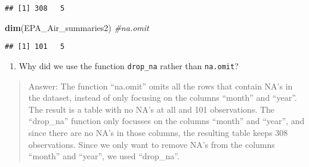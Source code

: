 \documentclass[
]{article}
\newenvironment{Shaded}{\begin{snugshade}}{\end{snugshade}}
\newcommand{\CommentTok}[1]{\textcolor[rgb]{0.56,0.35,0.01}{\textit{#1}}}
\newcommand{\KeywordTok}[1]{\textcolor[rgb]{0.13,0.29,0.53}{\textbf{#1}}}
\newcommand{\NormalTok}[1]{#1}
\providecommand{\tightlist}{%
  \setlength{\itemsep}{0pt}\setlength{\parskip}{0pt}}
\begin{document}
\begin{verbatim}
## [1] 308   5
\end{verbatim}

\begin{Shaded}
\begin{Highlighting}[]
\KeywordTok{dim}\NormalTok{(EPA_Air_summaries2) }\CommentTok{#na.omit}
\end{Highlighting}
\end{Shaded}

\begin{verbatim}
## [1] 101   5
\end{verbatim}

\begin{enumerate}
\def\labelenumi{\arabic{enumi}.}
\setcounter{enumi}{13}
\tightlist
\item
  Why did we use the function \texttt{drop\_na} rather than
  \texttt{na.omit}?
\end{enumerate}

\begin{quote}
Answer: The function ``na.omit'' omits all the rows that contain NA's in
the dataset, instead of only focusing on the columns ``month'' and
``year''. The result is a table with no NA's at all and 101
observations. The ``drop\_na'' function only focusses on the columns
``month'' and ``year'', and since there are no NA's in those columns,
the resulting table keeps 308 observations. Since we only want to remove
NA's from the columns ``month'' and ``year'', we used ``drop\_na''.
\end{quote}
\end{document}
